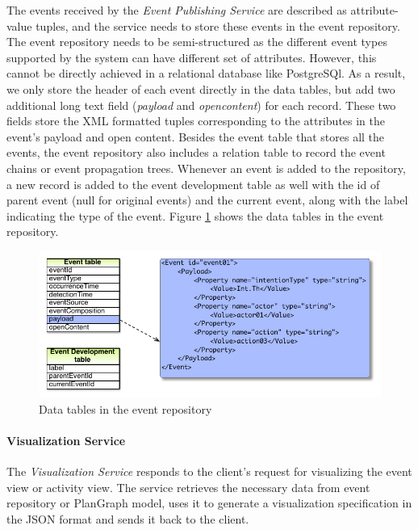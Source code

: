 The events received by the \emph{Event Publishing Service} are described as attribute-value tuples, and the service needs to store these events in the event repository. The event repository needs to be semi-structured as the different event types supported by the system can have different set of attributes. However, this cannot be directly achieved in a relational database like PostgreSQl. As a result, we only store the header of each event directly in the data tables, but add two additional long text field (\emph{payload} and \emph{opencontent}) for each record. These two fields store the XML formatted tuples corresponding to the attributes in the event's payload and open content. Besides the event table that stores all the events, the event repository also includes a relation table to record the event chains or event propagation trees. Whenever an event is added to the repository, a new record is added to the event development table as well with the id of parent event (null for original events) and the current event, along with the label indicating the type of the event. Figure \ref{fig:event_repository} shows the data tables in the event repository. 

\begin{figure}[htbp] %
	\centering
	\includegraphics{event_repository.pdf} 
	\caption{Data tables in the event repository}
	\label{fig:event_repository}
\end{figure}

\paragraph*{Visualization Service} %
\label{par:visualization_service}
The \emph{Visualization Service} responds to the client's request for visualizing the event view or activity view. The service retrieves the necessary data from event repository or PlanGraph model, uses it to generate a visualization specification in the JSON format and sends it back to the client. 


